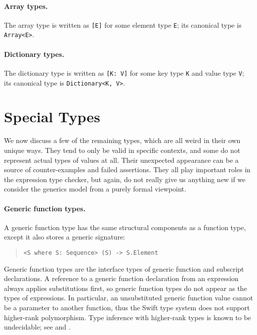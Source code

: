 \documentclass[../generics]{subfiles}
\begin{document}
\paragraph{Array types.} The array type is written as \texttt{[E]} for some element type \texttt{E}; its canonical type is \texttt{Array<E>}.

\paragraph{Dictionary types.} The dictionary type is written as \texttt{[K: V]} for some key type \texttt{K} and value type \texttt{V}; its canonical type is \texttt{Dictionary<K, V>}.

\section{Special Types}\label{misc types}

We now discuss a few of the remaining types, which are all weird in their own unique ways. They tend to only be valid in specific contexts, and some do not represent actual types of values at all. Their unexpected appearance can be a source of counter-examples and failed assertions. They all play important roles in the expression type checker, but again, do not really give us anything new if we consider the generics model from a purely formal viewpoint.

\paragraph{Generic function types.}
A generic function type has the same structural components as a function type, except it also stores a generic signature:
\begin{quote}
\begin{verbatim}
<S where S: Sequence> (S) -> S.Element
\end{verbatim}
\end{quote}

Generic function types are the interface types of generic function and subscript declarations. A reference to a generic function declaration from an expression always applies substitutions first, so generic function types do not appear as the types of expressions. In particular, an unsubstituted generic function value cannot be a parameter to another function, thus the Swift type system does not support higher-rank polymorphism. Type inference with higher-rank types is known to be undecidable; see \cite{wells} and \cite{practicalhigherrank}.
\end{document}
